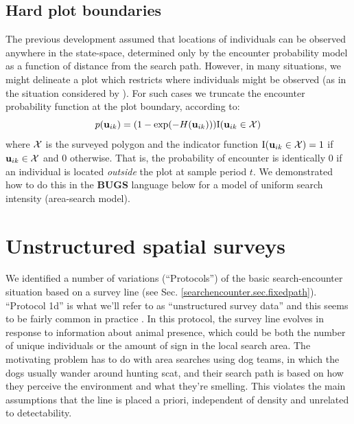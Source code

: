 \subsection{Hard plot boundaries}

The previous development assumed that locations of individuals can be
observed anywhere in the state-space, determined only by the encounter
probability model as a function of distance from the search path.
However, in many situations, we might delineate a plot which restricts
where individuals might be observed (as in the situation considered by
\citet{royle_young:2008}).  For such cases we truncate the encounter
probability function at the plot boundary, according to:
\begin{equation}
p({\bf u}_{ik}) = (1- \exp(-H({\bf u}_{ik}))) \mbox{I}({\bf u}_{ik} \in {\cal X})
\label{search-encounter.eq.hardplot}
\end{equation}
where ${\cal X}$ is the surveyed polygon and the indicator function
$\mbox{I}({\bf u}_{ik} \in {\cal X}) = 1$ if ${\bf u}_{ik} \in {\cal
  X}$ and 0 otherwise.  That is, the probability of encounter is
identically 0 if an individual is located {\it outside} the plot at
sample period $t$.  We demonstrated how to do this in the {\bf BUGS}
language below for a model of uniform search intensity (area-search
model).



\section{Unstructured spatial surveys}

We identified a number of variations (``Protocols'') of the basic
search-encounter situation based on a survey line (see
Sec. \ref{searchencounter.sec.fixedpath}).  ``Protocol 1d'' is what
we'll refer to as ``unstructured survey data'' and this seems to be
fairly common in practice \citep{thompson_etal:2012,
  russell_etal:2012}.  In this protocol, the survey line evolves in
response to information about animal presence, which could be both the
number of unique individuals or the amount of sign in the local search
area. The motivating problem has to do with area searches using dog
teams, in which the dogs usually wander around hunting scat, and their
search path is based on how they perceive the environment and what
they're smelling.  This violates the main assumptions that the line is
placed a priori, independent of density and unrelated to
detectability.  

